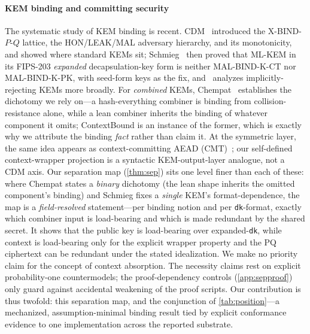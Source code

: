 \documentclass[journal]{IEEEtran}
\newcommand{\code}[1]{\texttt{\small #1}}
\begin{document}
\paragraph*{KEM binding and committing security}
The systematic study of KEM binding is recent. CDM~\cite{cdm} introduced the
\mbox{X-BIND-$P$-$Q$} lattice, the HON/LEAK/MAL adversary hierarchy, and its monotonicity, and
showed where standard KEMs sit; Schmieg~\cite{schmieg} then proved that ML-KEM in its FIPS-203
\emph{expanded} decapsulation-key form is neither \mbox{MAL-BIND-K-CT} nor \mbox{MAL-BIND-K-PK},
with seed-form keys as the fix, and~\cite{cdmrej} analyzes implicitly-rejecting KEMs more broadly.
For \emph{combined} KEMs, Chempat~\cite{chempat} establishes the dichotomy we rely on---a
hash-everything combiner is binding from collision-resistance alone, while a lean combiner inherits
the binding of whatever component it omits; ContextBound is an instance of the former, which is
exactly why we attribute the binding \emph{fact} rather than claim it. At the symmetric layer, the
same idea appears as context-committing AEAD (CMT)~\cite{cmt}; our self-defined context-wrapper
projection is a syntactic KEM-output-layer analogue, not a CDM axis. Our separation map
(\cref{thm:sep}) sits one level finer than each of these:
where Chempat states a \emph{binary} dichotomy (the lean shape inherits the omitted component's
binding) and Schmieg fixes a \emph{single} KEM's format-dependence, the map is a \emph{field-resolved}
statement---per binding notion and per \code{dk}-format, exactly which combiner input is
load-bearing and which is made redundant by the shared secret. It shows that the public key is
load-bearing over expanded-\code{dk}, while context is load-bearing only for the explicit wrapper
property and the PQ ciphertext can be redundant under the stated idealization. We make no priority
claim for the concept of context absorption. The necessity claims rest on explicit probability-one countermodels; the
proof-dependency controls (\cref{app:sepproof}) only guard against accidental weakening of the proof
scripts. Our contribution is thus twofold: this
separation map, and the conjunction of \cref{tab:position}---a mechanized, assumption-minimal binding
result tied by explicit conformance evidence to one implementation across the reported substrate.
\end{document}
